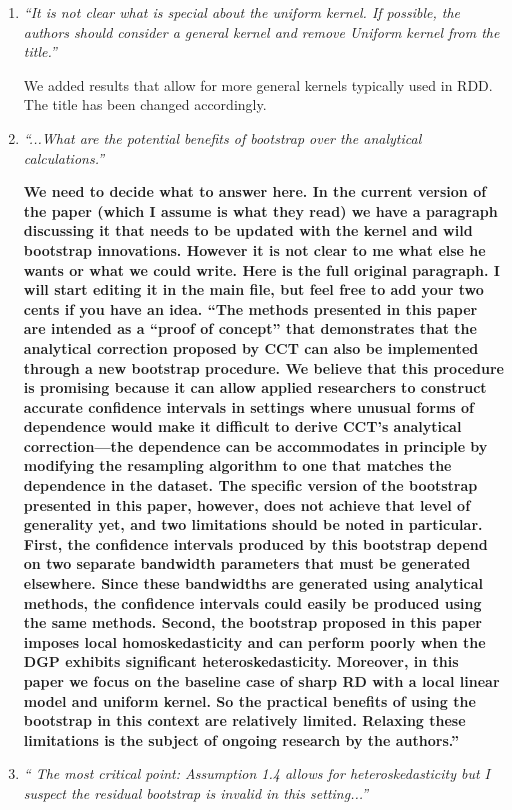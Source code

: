 \documentclass[12pt,fleqn]{article}
\begin{document}
\begin{enumerate}
 \item  \textit{``It is not clear what is special about the uniform kernel. If possible, the authors should consider a general kernel and remove Uniform kernel from the title.''}

 We added results that allow for more general kernels typically used in RDD. The title has been changed accordingly.

\item \textit{``...What are the potential benefits of bootstrap over the analytical calculations.''}

   \textbf{We need to decide what to answer here. In the current version of the paper (which I assume is what they read) we have a paragraph discussing it that needs to be updated with the kernel and wild bootstrap innovations. However it is not clear to me what else he wants or what we could write. Here is the full original paragraph. I will start editing it in the main file, but feel free to add your two cents if you have an idea. ``The methods presented in this paper are intended as a ``proof of concept'' that
demonstrates that the analytical correction proposed by CCT can also be
implemented through a new bootstrap procedure. We believe that this procedure is
promising because it can allow applied researchers to construct
accurate confidence intervals in settings where unusual forms of dependence
would make it difficult to derive CCT's analytical correction---the dependence
can be accommodates in principle by modifying the resampling algorithm to one
that matches the dependence in the dataset. The specific version of the bootstrap
presented in this paper, however, does not achieve that level of generality yet,
and two limitations should be noted in particular. First, the confidence
intervals produced by this bootstrap depend on two separate bandwidth parameters
that must be generated elsewhere. Since these bandwidths are generated using
analytical methods, the confidence intervals could easily be produced using the
same methods. Second, the bootstrap proposed in this paper imposes local
homoskedasticity and can perform poorly when the DGP exhibits significant
heteroskedasticity. Moreover, in this paper we focus on the baseline case of
sharp RD with a local linear model and uniform kernel. So the practical benefits
of using the bootstrap in this context are relatively limited. Relaxing these
limitations is the subject of ongoing research by the authors.''}

\item \textit{`` The most critical point: Assumption 1.4 allows for heteroskedasticity but I suspect the residual bootstrap is invalid in this setting...''}


\end{enumerate}
\end{document}

